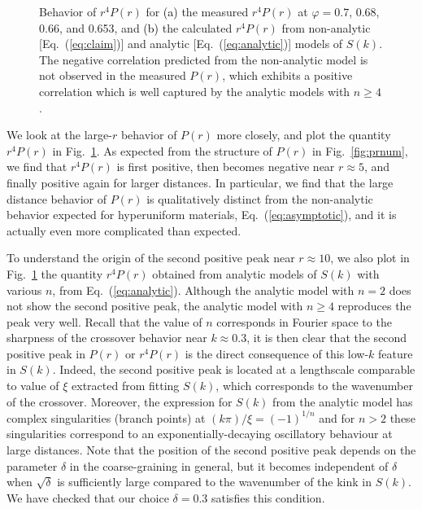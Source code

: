 \documentclass[aps,pre,twocolumn,superscriptaddress]{revtex4-1}
\newcommand{\red}[1]{\textcolor{black}{#1}}
\begin{document}
\begin{figure}
\begin{center}
\caption{Behavior of $r^4 P(r)$ for 
\red{(a)} the measured $r^4P(r)$ at $\varphi = 0.7$, 
0.68, 0.66, and 0.653, and  
\red{(b)} the calculated $r^4 P(r)$ 
from non-analytic [Eq.~(\ref{eq:claim})] 
and analytic [Eq.~(\ref{eq:analytic})] models of $S(k)$.
The negative correlation predicted from the non-analytic 
model is not observed in the measured $P(r)$, which 
exhibits a positive correlation which is well captured 
by the analytic models with $n \geq 4$.
}
\label{fig:pr4}
\end{center}
\end{figure}

We look at the large-$r$ behavior of $P(r)$ more closely, and
plot the quantity $r^4 P(r)$ in Fig.~\ref{fig:pr4}. 
As expected from the structure of $P(r)$ in Fig.~\ref{fig:prnum}, we
find that $r^4 P(r)$ is first positive, 
then becomes negative near $r \approx 5$, and 
finally positive again for larger distances.  
In particular, we find that the large distance behavior of 
$P(r)$ is qualitatively distinct from the non-analytic 
behavior expected for hyperuniform materials, 
Eq.~(\ref{eq:asymptotic}), and it is actually even more complicated
than expected.  

To understand the origin of the second positive peak near $r \approx 10$,  
we also plot in Fig.~\ref{fig:pr4} the quantity
$r^4 P(r)$ obtained from analytic models of $S(k)$ 
with various $n$, from Eq.~(\ref{eq:analytic}). 
Although the analytic model with $n=2$ does not show the second positive peak, 
the analytic model with $n \geq 4$ reproduces the peak very well.
Recall that the value of $n$ 
corresponds in Fourier space to the sharpness of the 
crossover behavior near $k \approx 0.3$, 
it is then clear that the second positive peak in $P(r)$ or $r^4 P(r)$ 
is the direct consequence of this low-$k$ feature in $S(k)$. 
Indeed, the second positive peak is located at a 
lengthscale comparable to value of $\xi$ extracted from 
fitting $S(k)$, which corresponds to the wavenumber of the crossover. 
Moreover, the expression for $S(k)$ from the analytic model has 
complex singularities (branch points) at 
$(k \pi)/\xi =(-1)^{1/n}$ and for $n>2$ these singularities 
correspond to an exponentially-decaying 
oscillatory behaviour at large distances.
Note that the position of the second positive peak depends 
on the parameter $\delta$ in the coarse-graining in general, 
but it becomes independent of $\delta$ 
when $\sqrt{\delta}$ is sufficiently large compared to the wavenumber 
of the kink in $S(k)$. We have checked that our 
choice $\delta = 0.3$ satisfies this condition.
\end{document}
